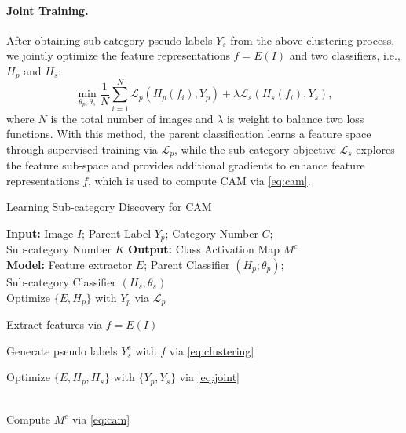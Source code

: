 \documentclass[10pt,twocolumn,letterpaper]{article}
\begin{document}
\paragraph{Joint Training.}
After obtaining sub-category pseudo labels $Y_s$ from the above clustering process, we jointly optimize the feature representations $f = E(I)$ and two classifiers, i.e., $H_p$ and $H_s$:
\begin{equation}
    \min_{\theta_p, \theta_s} \frac{1}{N} \sum_{i=1}^{N} \mathcal{L}_p(H_p(f_i), Y_p) + \lambda \mathcal{L}_s(H_s(f_i), Y_s),
    \label{eq:joint}
\end{equation}
where $N$ is the total number of images and $\lambda$ is weight to balance two loss functions.
With this method, the parent classification learns a feature space through supervised training via $\mathcal{L}_p$, while the sub-category objective $\mathcal{L}_s$ explores the feature sub-space and provides additional gradients to enhance feature representations $f$, which is used to compute CAM via \eqref{eq:cam}.













\begin{algorithm}[!t]
\vspace{0.1in}
\caption{Learning Sub-category Discovery for CAM}\label{alg:wwws}
\begin{algorithmic}
\State \textbf{Input:} Image $I$; Parent Label $Y_p$; Category Number $C$; \\ Sub-category Number $K$
\State \textbf{Output:} Class Activation Map $M^c$\\

\State \textbf{Model:} Feature extractor $E$; Parent Classifier $(H_p; \theta_p)$; \\ Sub-category Classifier $(H_s; \theta_s)$ \\

\State Optimize $\{E, H_p\}$ with $Y_p$ via $\mathcal{L}_p$

\State Extract features via $f = E(I)$

\State Generate pseudo labels $Y_s^c$ with $f$ via \eqref{eq:clustering}
\EndFor

\State Optimize $\{E, H_p, H_s\}$ with $\{Y_p, Y_s\}$ via \eqref{eq:joint}

\EndWhile
\\
Compute $M^c$ via \eqref{eq:cam}
\end{algorithmic}
\end{algorithm}
\vspace{-1mm}
\end{document}

